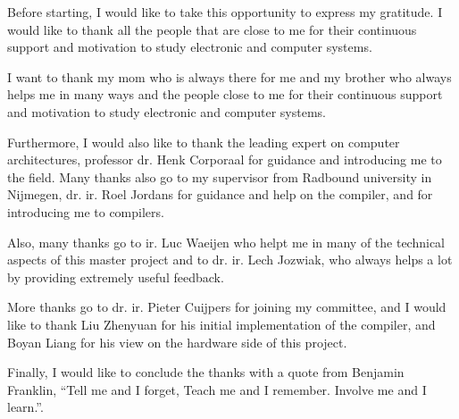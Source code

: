 Before starting, I would like to take this opportunity to express my gratitude. I would like to thank all the people that are close to me for their continuous support and motivation to study electronic and computer systems.

I want to thank my mom who is always there for me and my brother who always helps me in many ways and the people close to me for their continuous support and motivation to study electronic and computer systems.

Furthermore, I would also like to thank the leading expert on computer architectures, professor dr. Henk Corporaal for guidance and introducing me to the field. %
Many thanks also go to my supervisor from Radbound university in Nijmegen, dr. ir. Roel Jordans for guidance and help on the compiler, and for introducing me to compilers.

Also, many thanks go to ir. Luc Waeijen who helpt me in many of the technical aspects of this master project and to dr. ir. Lech Jozwiak, who always helps a lot by providing extremely useful feedback.

More thanks go to dr. ir. Pieter Cuijpers for joining my committee, and I would like to thank Liu Zhenyuan for his initial implementation of the compiler, and Boyan Liang for his view on the hardware side of this project.

Finally, I would like to conclude the thanks with a quote from Benjamin Franklin, ``Tell me and I forget, Teach me and I remember. Involve me and I learn.''.



